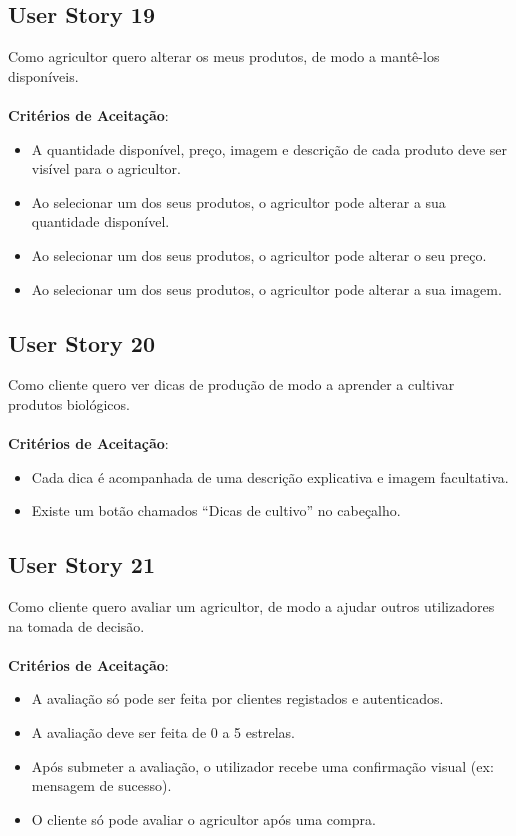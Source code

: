 \documentclass[a4paper,11pt]{article}
\begin{document}
\subsection{User Story 19}
Como agricultor quero alterar os meus produtos, de modo a mantê-los disponíveis.\\\\
\textbf{Critérios de Aceitação}:
\begin{itemize}
  \item A quantidade disponível, preço, imagem e descrição de cada produto deve ser visível para o agricultor.
  \item Ao selecionar um dos seus produtos, o agricultor pode alterar a sua quantidade disponível.
  \item Ao selecionar um dos seus produtos, o agricultor pode alterar o seu preço.
  \item Ao selecionar um dos seus produtos, o agricultor pode alterar a sua imagem.
\end{itemize}
\subsection{User Story 20}
Como cliente quero ver dicas de produção de modo a aprender a cultivar produtos biológicos.\\\\
\textbf{Critérios de Aceitação}:
\begin{itemize}
  \item Cada dica é acompanhada de uma descrição explicativa e imagem facultativa.
  \item Existe um botão chamados “Dicas de cultivo” no cabeçalho.
\end{itemize}
\subsection{User Story 21}
Como cliente quero avaliar um agricultor, de modo a ajudar outros utilizadores na tomada de decisão.\\\\
\textbf{Critérios de Aceitação}:
\begin{itemize}
  \item A avaliação só pode ser feita por clientes registados e autenticados.
  \item A avaliação deve ser feita de 0 a 5 estrelas.
  \item Após submeter a avaliação, o utilizador recebe uma confirmação visual (ex: mensagem de sucesso).
  \item O cliente só pode avaliar o agricultor após uma compra.
\end{itemize}
\end{document}
